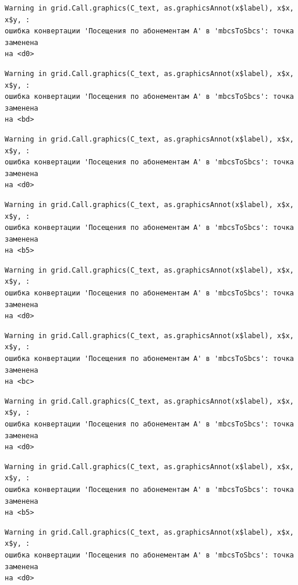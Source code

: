 \documentclass[
  letterpaper,
  DIV=11,
  numbers=noendperiod]{scrreprt}
\begin{document}
\begin{verbatim}
Warning in grid.Call.graphics(C_text, as.graphicsAnnot(x$label), x$x, x$y, :
ошибка конвертации 'Посещения по абонементам А' в 'mbcsToSbcs': точка заменена
на <d0>
\end{verbatim}

\begin{verbatim}
Warning in grid.Call.graphics(C_text, as.graphicsAnnot(x$label), x$x, x$y, :
ошибка конвертации 'Посещения по абонементам А' в 'mbcsToSbcs': точка заменена
на <bd>
\end{verbatim}

\begin{verbatim}
Warning in grid.Call.graphics(C_text, as.graphicsAnnot(x$label), x$x, x$y, :
ошибка конвертации 'Посещения по абонементам А' в 'mbcsToSbcs': точка заменена
на <d0>
\end{verbatim}

\begin{verbatim}
Warning in grid.Call.graphics(C_text, as.graphicsAnnot(x$label), x$x, x$y, :
ошибка конвертации 'Посещения по абонементам А' в 'mbcsToSbcs': точка заменена
на <b5>
\end{verbatim}

\begin{verbatim}
Warning in grid.Call.graphics(C_text, as.graphicsAnnot(x$label), x$x, x$y, :
ошибка конвертации 'Посещения по абонементам А' в 'mbcsToSbcs': точка заменена
на <d0>
\end{verbatim}

\begin{verbatim}
Warning in grid.Call.graphics(C_text, as.graphicsAnnot(x$label), x$x, x$y, :
ошибка конвертации 'Посещения по абонементам А' в 'mbcsToSbcs': точка заменена
на <bc>
\end{verbatim}

\begin{verbatim}
Warning in grid.Call.graphics(C_text, as.graphicsAnnot(x$label), x$x, x$y, :
ошибка конвертации 'Посещения по абонементам А' в 'mbcsToSbcs': точка заменена
на <d0>
\end{verbatim}

\begin{verbatim}
Warning in grid.Call.graphics(C_text, as.graphicsAnnot(x$label), x$x, x$y, :
ошибка конвертации 'Посещения по абонементам А' в 'mbcsToSbcs': точка заменена
на <b5>
\end{verbatim}

\begin{verbatim}
Warning in grid.Call.graphics(C_text, as.graphicsAnnot(x$label), x$x, x$y, :
ошибка конвертации 'Посещения по абонементам А' в 'mbcsToSbcs': точка заменена
на <d0>
\end{verbatim}
\end{document}
